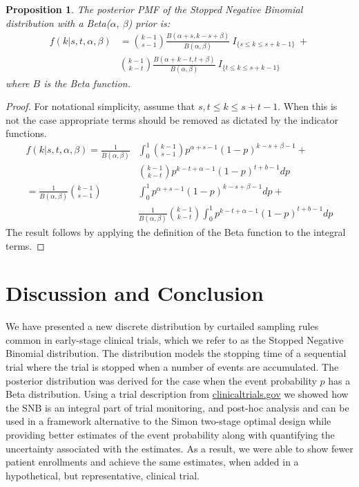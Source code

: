 \documentclass[review]{elsarticle}
\newtheorem{prop}{Proposition}
\begin{document}
\begin{prop}
The posterior PMF of the Stopped Negative Binomial distribution with a Beta($\alpha$, $\beta$) prior is:
\begin{align} \label{eqn:posterior}
f(k | s, t, \alpha, \beta) &= 
  {k-1 \choose s-1} \frac{B\left(\alpha+s, k-s+\beta \right)}{B(\alpha, \beta)} 
    \ I_{\{s \leq k \leq s+k-1\}} \ + \nonumber \\
  & {k-1 \choose k-t} 
    \frac{B\left(\alpha + k - t, t+\beta\right)}{B(\alpha, \beta)} 
    \ I_{\{t \leq k \leq s+k-1\}}
\end{align}
where $B$ is the Beta function.
\end{prop}
\begin{proof}
For notational simplicity, assume that $s,t \leq k \leq s+t-1$. When this is not the case appropriate terms should be removed as dictated by the indicator functions.
\begin{align*}
f(k | s, t, \alpha, \beta) = \frac{1}{B(\alpha, \beta)} & \int_0^1 {k-1 \choose s-1} p^{\alpha +s -1} \left(1-p\right)^{k-s+\beta-1} + \\
 & {k-1 \choose k-t} p^{k-t+\alpha-1}\left(1-p\right)^{t+b-1} dp \\
= \frac{1}{B(\alpha, \beta)}  {k-1 \choose s-1} & \int_0^1  p^{\alpha +s -1} \left(1-p\right)^{k-s+\beta-1} dp + \\
 & \frac{1}{B(\alpha, \beta)} {k-1 \choose k-t} \int_0^1  p^{k-t+\alpha-1}\left(1-p\right)^{t+b-1} dp
\end{align*}
The result follows by applying the definition of the Beta function to the integral terms.
\end{proof}

\section{Discussion and Conclusion}

We have presented a new discrete distribution by curtailed sampling rules common in early-stage clinical trials, which we refer to as the Stopped Negative Binomial distribution. The distribution models the stopping time of a sequential trial where the trial is stopped when a number of events are accumulated. The
posterior distribution was derived for the case when the event probability $p$
has a Beta distribution. Using a trial description from
\url{clinicaltrials.gov} we showed how the SNB is an integral part of trial
monitoring, and post-hoc analysis and can be used in a framework alternative
to the Simon two-stage optimal design while providing better estimates of the
event probability along with quantifying the uncertainty associated with the
estimates. As a result, we were able to show fewer patient enrollments and
achieve the same estimates, when added in a hypothetical, but representative,
clinical trial.
\end{document}
